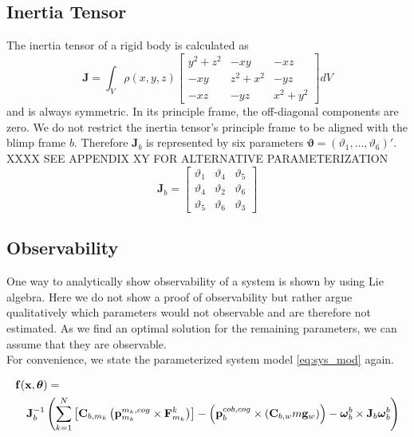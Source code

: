 \subsection{Inertia Tensor}
\label{sub:par_inertia}
The inertia tensor of a rigid body is calculated as
\begin{equation}
\mathbf{J} = \int_V \rho(x,y,z) 
\left[ \begin{array}{ccc}
y^2+z^2 & - xy    & - xz \\
- xy    & z^2+x^2 & - yz \\
- xz    & - yz    & x^2+y^2
\end{array} \right] dV
\end{equation}
and is always symmetric.
In its principle frame, the off-diagonal components are zero.
We do not restrict the inertia tensor's principle frame to be aligned with the blimp frame $b$.
Therefore $\mathbf{J}_b$ is represented by six parameters $\boldsymbol{\vartheta} = (\vartheta_1, \hdots, \vartheta_6)'$.
XXXX SEE APPENDIX XY FOR ALTERNATIVE PARAMETERIZATION
\begin{equation}
\mathbf{J}_b = 
\left[ \begin{array}{ccc}
\vartheta_1 & \vartheta_4 & \vartheta_5 \\
\vartheta_4 & \vartheta_2 & \vartheta_6 \\
\vartheta_5 & \vartheta_6 & \vartheta_3
\end{array} \right]
\end{equation}


\subsection{Observability}
\label{sub:observability}
One way to analytically show observability of a system is shown by \citet{hermann1977} using Lie algebra. 
Here we do not show a proof of observability but rather argue qualitatively which parameters would not observable and are therefore not estimated.
As we find an optimal solution for the remaining parameters, we can assume that they are observable.
\\
For convenience, we state the parameterized system model \eqref{eq:sys_mod} again.

\begin{eqnarray*}
\lefteqn{
\mathbf{f}(\mathbf{x}, \boldsymbol{\theta}) = {}} \\
& & {} \mathbf{J}_b^{-1} \left( 
\sum_{k=1}^N  \left[  \mathbf{C}_{b,m_k} \left( \mathbf{p}^{m_k,cog}_{m_k} \times \mathbf{F}^k_{m_k} \right)  \right]
-
\left( \mathbf{p}^{cob,cog}_b \times (\mathbf{C}_{b,w}m\mathbf{g}_w) \right)
- \boldsymbol{\omega}_b^b \times \mathbf{J}_b \boldsymbol{\omega}_b^b \right)
\end{eqnarray*}

